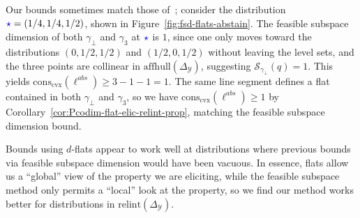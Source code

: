 \documentclass[11pt]{article} %
\newcommand{\simplex}{\Delta_\Y}
\newcommand{\relint}[1]{\mathrm{relint}(#1)}
\newcommand{\conscvx}{\mathrm{cons}_\mathrm{cvx}}
\newcommand{\affhull}{\mathrm{affhull}}
\newcommand{\Sc}{\mathcal{S}}  %
\newcommand{\Y}{\mathcal{Y}}
\begin{document}
Our bounds sometimes match those of~\citep{ramaswamy2016convex}; consider the distribution ${\color{blue}\star} = (1/4, 1/4, 1/2)$, shown in Figure~\ref{fig:fsd-flats-abstain}.
The feasible subspace dimension of both $\gamma_\bot$ and $\gamma_3$ at ${\color{blue}\star}$ is $1$, since one only moves toward the distributions $(0,1/2, 1/2)$ and $(1/2, 0, 1/2)$ without leaving the level sets, and the three points are collinear in $\affhull(\simplex)$, suggesting $\Sc_{\gamma_\bot}(q) = 1$.  
This yields $\conscvx(\ell^{abs}) \geq 3 - 1- 1 = 1$.
The same line segment defines a flat contained in both $\gamma_\bot$ and $\gamma_3$, so we have $\conscvx(\ell^{abs}) \geq 1$ by Corollary~\ref{cor:Pcodim-flat-elic-relint-prop}, matching the feasible subspace dimension bound.

Bounds using $d$-flats appear to work well at distributions where previous bounds via feasible subspace dimension would have been vacuous.
In essence, flats allow us a ``global'' view of the property we are eliciting, while the feasible subspace method only permits a ``local'' look at the property, so we find our method works better for distributions in $\relint\simplex$.


\end{document}
